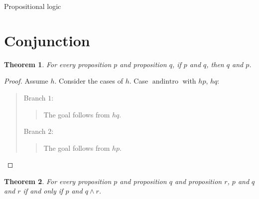 \documentclass[11pt]{article}
\newtheorem{theorem}{Theorem}[section]
\theoremstyle{definition}
\begin{document}
\begin{center}
{\LARGE Propositional logic}
\end{center}
\section{Conjunction}
\label{ll:main:conjunction}
\begin{theorem}
\label{ll:main:and-comm}
For every proposition \(p\) and proposition \(q\), if \(p\) and \(q\), then \(q\) and \(p\).
\end{theorem}
\begin{proof}
Assume \(h\).
Consider the cases of \(h\).
Case \(\operatorname{andintro}\) with \(hp\), \(hq\):
\begin{quote}
Branch \(1\):
\begin{quote}
The goal follows from \(hq\).
\end{quote}
Branch \(2\):
\begin{quote}
The goal follows from \(hp\).
\end{quote}
\end{quote}
\end{proof}
\begin{theorem}
\label{ll:main:and-assoc}
For every proposition \(p\) and proposition \(q\) and proposition \(r\), \(p\) and \(q\) and \(r\) if and only if \(p\) and \(q \land r\).
\end{theorem}
\end{document}
